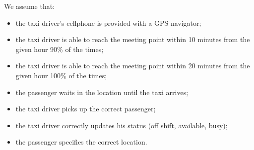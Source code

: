 We assume that:
\begin{itemize}
\item the taxi driver's cellphone is provided with a GPS navigator;
\item the taxi driver is able to reach the meeting point within 10 minutes from the given hour 90\% of the times;
\item the taxi driver is able to reach the meeting point within 20 minutes from the given hour 100\% of the times;
\item the passenger waits in the location until the taxi arrives;
\item the taxi driver picks up the correct passenger;
\item the taxi driver correctly updates his status (off shift, available, busy);
\item the passenger specifies the correct location.
\end{itemize}
